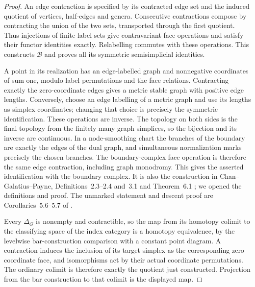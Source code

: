 \begin{proof}
An edge contraction is specified by its contracted edge set and the induced quotient of vertices, half-edges and genera. Consecutive contractions compose by contracting the union of the two sets, transported through the first quotient. Thus injections of finite label sets give contravariant face operations and satisfy their functor identities exactly. Relabelling commutes with these operations. This constructs $\mathcal B$ and proves all its symmetric semisimplicial identities.

A point in its realization has an edge-labelled graph and nonnegative coordinates of sum one, modulo label permutations and the face relations. Contracting exactly the zero-coordinate edges gives a metric stable graph with positive edge lengths. Conversely, choose an edge labelling of a metric graph and use its lengths as simplex coordinates; changing that choice is precisely the symmetric identification. These operations are inverse. The topology on both sides is the final topology from the finitely many graph simplices, so the bijection and its inverse are continuous. In a node-smoothing chart the branches of the boundary are exactly the edges of the dual graph, and simultaneous normalization marks precisely the chosen branches. The boundary-complex face operation is therefore the same edge contraction, including graph monodromy. This gives the asserted identification with the boundary complex. It is also the construction in Chan--Galatius--Payne, Definitions~2.3--2.4 and~3.1 and Theorem~6.1 \cite{D_CGPMarked2022}; we opened the definitions and proof. The unmarked statement and descent proof are Corollaries~5.6--5.7 of \cite{D_CGP2021}.

Every $\Delta_G$ is nonempty and contractible, so the map from its homotopy colimit to the classifying space of the index category is a homotopy equivalence, by the levelwise bar-construction comparison with a constant point diagram. A contraction induces the inclusion of its target simplex as the corresponding zero-coordinate face, and isomorphisms act by their actual coordinate permutations. The ordinary colimit is therefore exactly the quotient just constructed. Projection from the bar construction to that colimit is the displayed map.


\end{proof}
